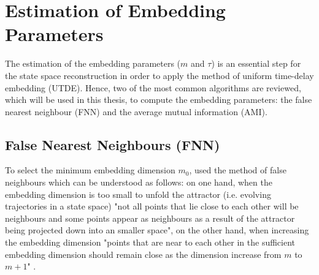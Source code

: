 \section{Estimation of Embedding Parameters}
The estimation of the embedding parameters ($m$ and $\tau$) is an essential 
step for the state space reconstruction in order to apply the method of
uniform time-delay embedding (UTDE). 
Hence, two of the most common algorithms are reviewed, 
which will be used in this thesis, to compute the embedding
parameters: the false nearest neighbour (FNN) and the average mutual 
information (AMI).

\subsection{False Nearest Neighbours (FNN)} \label{ch3:fnn}
To select the minimum embedding dimension $m_0$, \cite{kennel1992}
used the method of false neighbours which can be understood as follows:
on one hand, when the embedding dimension is too small to unfold the attractor
(i.e. evolving trajectories in a state space) 
"not all points that lie close to each other will be neighbours and some points
appear as neighbours as a result of the attractor being projected down into an
smaller space", on the other hand, when increasing the embedding dimension 
"points that are near to each other in the sufficient embedding dimension 
should remain close as the dimension increase from $m$ to $m+1$"
\citep[p. 3]{krakovska2015}.


